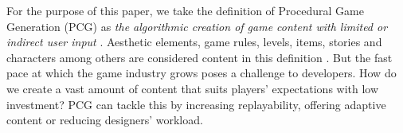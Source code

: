\documentclass[sigconf]{acmart}
\begin{document}
For the purpose of this paper, we take the definition of Procedural Game 
Generation
(PCG) as \textit{the algorithmic creation of game content with
	limited or indirect user input} \cite{togelius2011procedural}.  
Aesthetic elements, game rules, levels, items, stories and characters
among others are considered content in this definition  
\cite{togelius2011procedural}. %
%
But the fast pace at which the game industry grows poses a challenge to 
developers. 
How do we create a vast amount of content that suits 
players' expectations with low investment? PCG can tackle this by  
increasing replayability, offering adaptive content or reducing designers' 
workload.\cite{togelius2016introduction}
\end{document}
